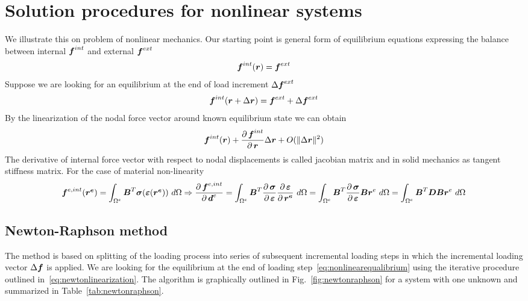 \section{Solution procedures for nonlinear systems}
We illustrate this on problem of nonlinear mechanics. Our starting point is general form of equilibrium equations expressing the balance between internal $\mbox{\boldmath$f$}^{int}$ and external $\mbox{\boldmath$f$}^{ext}$
$$
\mbox{\boldmath$f$}^{int}(\mbox{\boldmath$r$}) = \mbox{\boldmath$f$}^{ext}
$$
Suppose we are looking for an equilibrium at the end of load increment $\Delta\mbox{\boldmath$f$}^{ext}$
\begin{equation}
  \mbox{\boldmath$f$}^{int}(\mbox{\boldmath$r$}+\Delta\mbox{\boldmath$r$}) = \mbox{\boldmath$f$}^{ext}+\Delta\mbox{\boldmath$f$}^{ext}
  \label{eq:nonlinearequalibrium}
\end{equation}
By the linearization of the nodal force vector around known equilibrium state we can obtain
\begin{equation}
  \mbox{\boldmath$f$}^{int}(\mbox{\boldmath$r$})+\mbox{$\displaystyle\frac{\partial \,{\mbox{\boldmath$f$}^{int}}}{\partial \,{\mbox{\boldmath$r$}}}$}\Delta\mbox{\boldmath$r$}+O(\|\Delta\mbox{\boldmath$r$}\|^2)
\end{equation}
The derivative of internal force vector with respect to nodal displacements is called jacobian matrix and in solid mechanics as tangent stiffness matrix.
For the case of material non-linearity
$$
\mbf{f}^{e,int}(\mbf{r^e})=\int_{\Omega^e}\mbf{B}^T\mbf{\sigma}(\mbf{\eps}(\mbf{r^e}))\ d\Omega \Rightarrow
\pard{\mbf{f}^{e,int}}{\mbf{d}^e} = \int_{\Omega^e}\mbf{B}^T\pard{\mbf{\sigma}}{\mbf{\eps}}\pard{\mbf{\eps}}{\mbf{r^e}}\ d\Omega =
\int_{\Omega^e}\mbf{B}^T\pard{\mbf{\sigma}}{\mbf{\eps}}\mbf{B}{\mbf{r}^e}\ d\Omega =
\int_{\Omega^e}\mbf{B}^T\mbf{D}\mbf{B}{\mbf{r}^e}\ d\Omega
\label{eq:newtonlinearization}
$$

\subsection{Newton-Raphson method}
The method is based on splitting of the loading process into series of subsequent incremental loading steps in which the incremental loading vector $\Delta\mbox{\boldmath$f$}$ is applied. We are looking for the equilibrium at the end of loading step~\ref{eq:nonlinearequalibrium} using the iterative procedure outlined in~\ref{eq:newtonlinearization}. The algorithm is graphically outlined in Fig.~\ref{fig:newtonraphson} for a system with one unknown and summarized in Table~\ref{tab:newtonraphson}.

